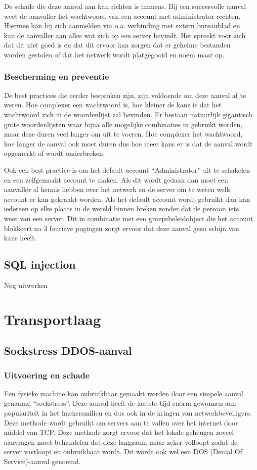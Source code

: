 \documentclass[pdftex,a4paper,12pt]{report}
\begin{document}
De schade die deze aanval aan kan richten is immens. Bij een succesvolle aanval weet de aanvaller het wachtwoord van een account met administrator rechten. Hiermee kan hij zich aanmelden via o.a. verbinding met extern bureaublad en kan de aanvaller aan alles wat zich op een server bevindt. Het spreekt voor zich dat dit niet goed is en dat dit ervoor kan zorgen dat er geheime bestanden worden gestolen of dat het netwerk wordt platgegooid en noem maar op.

\subsubsection{Bescherming en preventie}
De best practices die eerder besproken zijn, zijn voldoende om deze aanval af te weren. Hoe complexer een wachtwoord is, hoe kleiner de kans is dat het wachtwoord zich in de woordenlijst zal bevinden. Er bestaan natuurlijk gigantisch grote woordenlijsten waar bijna alle mogelijke combinaties in gebruikt worden, maar deze duren veel langer om uit te voeren. Hoe complexer het wachtwoord, hoe langer de aanval ook moet duren dus hoe meer kans er is dat de aanval wordt opgemerkt of wordt onderbroken. \newline 

Ook een best practice is om het default account "`Administrator"' uit te schakelen en een zelfgemaakt account te maken. Als dit wordt gedaan dan moet een aanvaller al kennis hebben over het netwerk en de server om te weten welk account er kan gekraakt worden. Als het default account wordt gebruikt dan kan iedereen op elke plaats in de wereld binnen breken zonder dat de persoon iets weet van een server. Dit in combinatie met een groepsbeleidobject die het account blokkeert na 3 foutieve pogingen zorgt ervoor dat deze aanval geen schijn van kans heeft.

\subsection{SQL injection}
Nog uitwerken

\section{Transportlaag}
\subsection{Sockstress DDOS-aanval}
\subsubsection{Uitvoering en schade}
Een fysieke machine kan onbruikbaar gemaakt worden door een simpele aanval genaamd "`sockstress"'. Deze aanval heeft de laatste tijd enorm gewonnen aan populariteit in het hackersmilieu en dus ook in de kringen van netwerkbeveiligers. Deze methode wordt gebruikt om servers aan te vallen over het internet door middel van TCP. Deze methode zorgt ervoor dat het lokale geheugen zoveel aanvragen moet behandelen dat deze langzaam maar zeker volloopt zodat de server vastloopt en onbruikbaar wordt. Dit wordt ook wel een DOS (Denial Of Service)-aanval genoemd. \newline 
\end{document}
